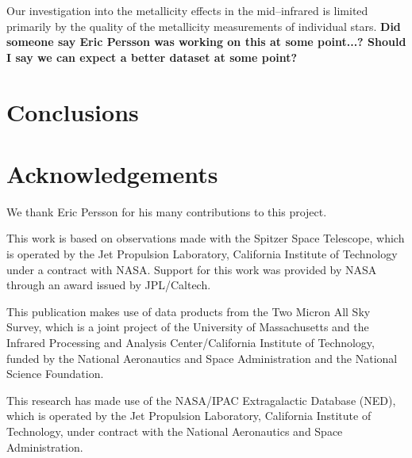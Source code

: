 \documentclass[a4paper,fleqn,usenatbib]{mnras}
\begin{document}

Our investigation into the metallicity effects in the mid--infrared is limited primarily by the quality of the metallicity measurements of individual stars. {\bf Did someone say Eric Persson was working on this at some point...? Should I say we can expect a better dataset at some point?}

\section{Conclusions}
\label{sec:conclusions}

\section*{Acknowledgements}
\label{sec:acknowledgements}

We thank Eric Persson for his many contributions to this project.

This work is based on observations made with the Spitzer Space Telescope, which is operated by the Jet Propulsion Laboratory, California Institute of Technology under a contract with NASA. Support for this work was provided by NASA through an award issued by JPL/Caltech.

This publication makes use of data products from the Two Micron All Sky Survey, which is a joint project of the University of Massachusetts and the Infrared Processing and Analysis Center/California Institute of Technology, funded by the National Aeronautics and Space Administration and the National Science Foundation.

This research has made use of the NASA/IPAC Extragalactic Database (NED), which is operated by the Jet Propulsion Laboratory, California Institute of Technology, under contract with the National Aeronautics and Space Administration.



\end{document}
